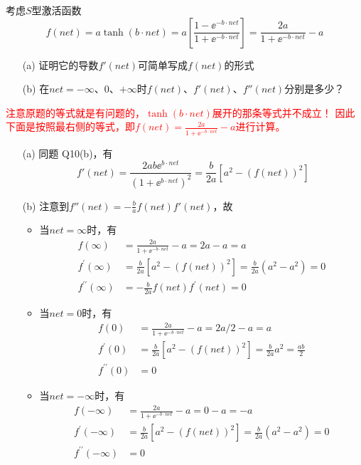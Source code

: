 \documentclass[reportComp]{thesis}
\begin{document}
\begin{question}[\textsection 6 Q26]
考虑$S$型激活函数
\[f(net) = a \tanh (b\cdot net)
= a\left[\frac{1-\ee^{-b \cdot net}}{1+\ee^{-b\cdot net}}\right]
= \frac{2 a}{1+\ee^{-b\cdot net}}-a\]
\begin{itemize}
	\item [(a)] 证明它的导数$f'(net)$可简单写成$f(net)$的形式
	\item [(b)] 在$net=-\infty$、$0$、$+\infty$时$f(net)$、$f'(net)$、$f''(net)$分别是多少？
\end{itemize}
\end{question}
\begin{answer}
\textcolor{red}{注意原题的等式就是有问题的，$\tanh(b\cdot net)$展开的那条等式并不成立！
因此下面是按照最右侧的等式，即$f(net)=\frac{2 a}{1+\ee^{-b\cdot net}}-a$进行计算。}
\begin{itemize}
	\item [(a)] 同题 Q10(b)，有
	\[f'(net)=\frac{2ab\ee^{b\cdot net}}{(1+\ee^{b\cdot net})^2}=\frac{b}{2a}[a^2-(f(net))^2]\]
	\item [(b)] 注意到$f''(net)=-\frac{b}{a}f(net)f'(net)$，故
	\begin{itemize}
		\item 当$net=\infty$时，有
		\[\begin{aligned}
		f(\infty) &=\frac{2 a}{1+\ee^{-b\cdot n e t}}-a=2 a-a=a \\
		f^{\prime}(\infty) &=\frac{b}{2 a}\left[a^{2}-(f(n e t))^{2}\right]=\frac{b}{2 a}\left(a^{2}-a^{2}\right)=0 \\
		f^{\prime \prime}(\infty) &=-\frac{b}{2 a} f(n e t) f^{\prime}(n e t)=0
		\end{aligned}\]
		\item 当$net=0$时，有
		\[\begin{aligned}
		f(0) &=\frac{2 a}{1+\ee^{-b\cdot n e t}}-a=2 a/2-a=a \\
		f^{\prime}(0) &=\frac{b}{2 a}\left[a^{2}-(f(n e t))^{2}\right]=\frac{b}{2 a}a^2=\frac{ab}{2} \\
		f^{\prime \prime}(0) &= 0
		\end{aligned}\]
		\item 当$net=-\infty$时，有
		\[\begin{aligned}
		f(-\infty) &=\frac{2 a}{1+\ee^{-b\cdot n e t}}-a=0-a=-a \\
		f^{\prime}(-\infty) &=\frac{b}{2 a}\left[a^{2}-(f(n e t))^{2}\right]=\frac{b}{2 a}\left(a^{2}-a^{2}\right)=0 \\
		f^{\prime \prime}(-\infty) &=0
		\end{aligned}\]
	\end{itemize}
\end{itemize}
\end{answer}
\end{document}
